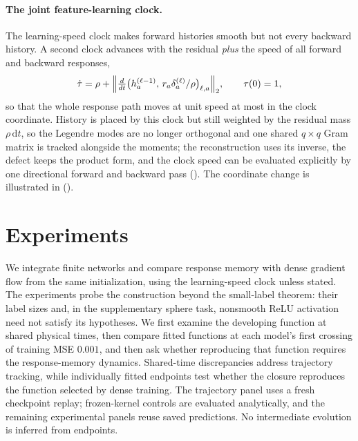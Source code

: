 \documentclass[11pt]{article}
\theoremstyle{definition}
\theoremstyle{remark}
\newcommand{\dd}{\,\mathrm{d}}
\begin{document}
\paragraph{The joint feature-learning clock.}
The learning-speed clock makes forward histories smooth but not every backward
history.  A second clock advances with the residual \emph{plus} the speed of all
forward and backward responses,
\begin{equation}
 \dot\tau=\rho+\Bigl\|\tfrac{d}{dt}\bigl(h_a^{(\ell-1)},\,r_a\delta_a^{(\ell)}/\rho\bigr)_{\ell,a}\Bigr\|_2,
 \qquad\tau(0)=1,                                         \label{eq:new-clock}
\end{equation}
so that the whole response path moves at unit speed at most in the clock
coordinate.  History is placed by this clock but still weighted by the residual
mass $\rho\dd t$, so the Legendre modes are no longer orthogonal and one shared
$q\times q$ Gram matrix is tracked alongside the moments; the reconstruction uses
its inverse, the defect keeps the product form, and the clock speed can be
evaluated explicitly by one directional forward and backward pass
().
The coordinate change is illustrated in  ().



\section{Experiments}
\label{sec:experiments}

We integrate finite networks and compare response memory with dense gradient
flow from the same initialization, using the learning-speed clock unless stated.
The experiments probe the construction beyond the small-label theorem:
their label sizes and, in the supplementary sphere task, nonsmooth ReLU
activation need not satisfy its hypotheses.
We first examine the developing function at shared physical times, then compare
fitted functions at each model's first crossing of training MSE $0.001$, and
then ask whether reproducing that function requires the response-memory
dynamics.  Shared-time discrepancies address trajectory tracking, while
individually fitted endpoints test whether the closure reproduces the function
selected by dense training. The trajectory panel uses a fresh checkpoint
replay; frozen-kernel controls are evaluated analytically, and the remaining
experimental panels reuse saved predictions.  No intermediate evolution is
inferred from endpoints.
\end{document}
